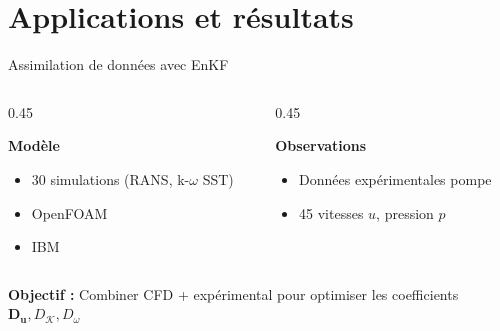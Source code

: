 \documentclass[10pt, aspectratio=169, dvipsnames]{beamer}
\begin{document}
\section{Applications et résultats} 

    \begin{frame}{Assimilation de données avec EnKF}

        \begin{columns}[T]
            \begin{column}{0.45\textwidth}
                \begin{block}{\textbf{Modèle}}
                \begin{itemize}
                    \item 30 simulations (RANS, k-$\omega$ SST)
                    \item OpenFOAM
                    \item IBM
                \end{itemize}
                \end{block}
            \end{column}

            \begin{column}{0.45\textwidth}
                \begin{block}{\textbf{Observations}}
                \begin{itemize}
                    \item Données expérimentales pompe
                    \item 45 vitesses $u$, pression $p$
                \end{itemize}
                \end{block}
            \end{column}
        \end{columns}

    \vspace{0.5cm}

    \centering
    \textbf{Objectif :} Combiner CFD + expérimental pour optimiser les coefficients $\boldsymbol{D_u}, D_\mathcal{K}, D_\omega$
    
    \vspace{1cm}


\end{frame}
\end{document}
